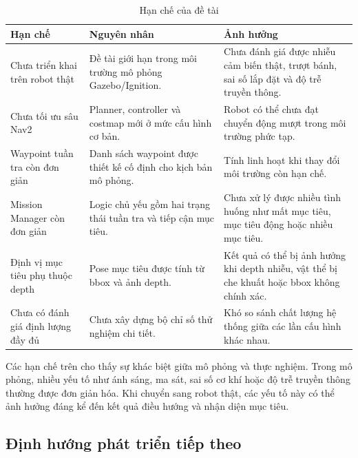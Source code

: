 \begin{table}[H]
    \centering
    \caption{Hạn chế của đề tài}
    \label{tab:project-limitations}
    \renewcommand{\arraystretch}{1.25}
    \small
    \begin{tabularx}{\textwidth}{|>{\raggedright\arraybackslash}p{}|>{\raggedright\arraybackslash}p{}|>{\raggedright\arraybackslash}X|}
        \hline
        \textbf{Hạn chế} & \textbf{Nguyên nhân} & \textbf{Ảnh hưởng} \\
        \hline
        Chưa triển khai trên robot thật & Đề tài giới hạn trong môi trường mô phỏng Gazebo/Ignition. & Chưa đánh giá được nhiễu cảm biến thật, trượt bánh, sai số lắp đặt và độ trễ truyền thông. \\
        \hline
        Chưa tối ưu sâu Nav2 & Planner, controller và costmap mới ở mức cấu hình cơ bản. & Robot có thể chưa đạt chuyển động mượt trong môi trường phức tạp. \\
        \hline
        Waypoint tuần tra còn đơn giản & Danh sách waypoint được thiết kế cố định cho kịch bản mô phỏng. & Tính linh hoạt khi thay đổi môi trường còn hạn chế. \\
        \hline
        Mission Manager còn đơn giản & Logic chủ yếu gồm hai trạng thái tuần tra và tiếp cận mục tiêu. & Chưa xử lý được nhiều tình huống như mất mục tiêu, mục tiêu động hoặc nhiều mục tiêu. \\
        \hline
        Định vị mục tiêu phụ thuộc depth & Pose mục tiêu được tính từ bbox và ảnh depth. & Kết quả có thể bị ảnh hưởng khi depth nhiễu, vật thể bị che khuất hoặc bbox không chính xác. \\
        \hline
        Chưa có đánh giá định lượng đầy đủ & Chưa xây dựng bộ chỉ số thử nghiệm chi tiết. & Khó so sánh chất lượng hệ thống giữa các lần cấu hình khác nhau. \\
        \hline
    \end{tabularx}
\end{table}

Các hạn chế trên cho thấy sự khác biệt giữa mô phỏng và thực nghiệm. Trong mô phỏng, nhiều yếu tố như ánh sáng, ma sát, sai số cơ khí hoặc độ trễ truyền thông thường được đơn giản hóa. Khi chuyển sang robot thật, các yếu tố này có thể ảnh hưởng đáng kể đến kết quả điều hướng và nhận diện mục tiêu.

\subsection{Định hướng phát triển tiếp theo}
\label{subsec:future-directions}

